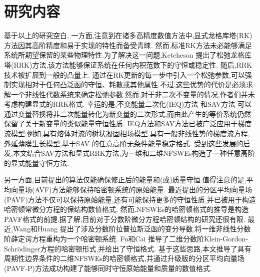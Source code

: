 \section{研究内容}
基于以上的研究空白, 
一方面,注意到在诸多高精度数值方法中,显式龙格库塔(RK)方法因其高阶精度和易于实现的特性而备受青睐.
然而,标准RK方法未必能够满足系统所期望保留的某些物理特性.为了解决这一问题,Ketcheson \cite{ketchesonRelaxationRungeKutta2019} 提出了松弛龙格库塔(RRK)方法,该方法能够保证系统在任何内积范数下的守恒或稳定性.
随后,RRK技术被扩展到一般的凸量上\cite{ranochaRelaxationRungeKutta2020}.
通过在RK更新的每一步中引入一个松弛参数,可以强制实现相对于任何凸泛函的守恒、耗散或其他属性.不过,这些优势的代价是必须求解一个非线性代数系统来确定松弛参数.然而,对于非二次不变量的情况,作者们并未考虑构建显式的RRK格式.
幸运的是,不变能量二次化(IEQ)方法 \cite{yangLinearUnconditionallyEnergy2017, yangEfficientLinearSchemes2017} 和SAV方法 \cite{chengConvergenceEnergyconservingScheme2022} 可以通过变量替换将非二次能量转化为新变量的二次形式,而由此产生的等价系统仍然保留了关于新变量的类似能量守恒性质.
IEQ方法和SAV方法已被广泛应用于梯度流模型\cite{zhaoNumericalApproximationsPhase2017,shenScalarAuxiliaryVariable2018,liuExponentialScalarAuxiliary2020,chengMultipleScalarAuxiliary2018}.例如,具有熔体对流\cite{chenEfficientNumericalScheme2019}的树状凝固相场模型,具有一般非线性势的梯度流方程\cite{yangConvergenceAnalysisInvariant2020},外延薄膜生长模型\cite{chengHighlyEfficientAccurate2019},基于SAV \cite{gongArbitrarilyHighorderUnconditionally2020}的任意高阶无条件能量稳定格式.
受到这些发展的启发,本文结合SAV方法和显式RRK方法,为一维和二维NFSWEs构造了一种任意高阶的显式能量守恒方法.

另一方面,目前提出的算法仅能确保修正后的能量和(或)质量守恒.值得注意的是,平均向量场(AVF)方法能够保持哈密顿系统的原始能量\cite{buddGeometricIntegrationUsing1999,quispelNewClassEnergypreserving2008}. 
最近提出的分区平均向量场(PAVF)方法不仅可以保持原始能量,还有可能保持更多的守恒性质,并已被用于构造哈密顿常微分方程的保结构数值格式\cite{caiPartitionedAveragedVector2018}.
然而,NFSWEs的哈密顿格式的推导是构造PAVF格式的前提.据了解,目前对于分数阶微分方程哈密顿结构的研究还很有限.
最近,Wang和Huang \cite{wangStructurepreservingNumericalMethods2018} 提出了涉及分数阶拉普拉斯泛函的变分导数,将一维非线性分数阶薛定谔方程重构为一个哈密顿系统.
Fu和Cai \cite{fuStructurepreservingAlgorithmsTwodimensional2020} 推导了二维分数阶Klein-Gordon-Schr{\"o}dinger方程的哈密顿形式,并给出了守恒格式.
基于这些思路,本文推导了具有周期性边界条件的二维NFSWEs的哈密顿格式,并通过升级版的分区平均向量场(PAVF-P)方法成功构建了能够同时守恒原始能量和质量的数值格式.

